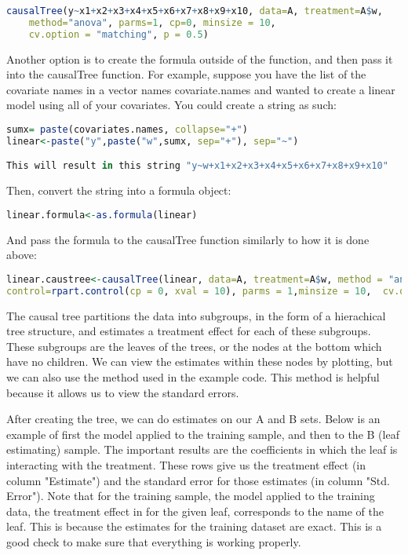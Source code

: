 \documentclass{article}
\begin{document}
\begin{lstlisting}[language=R]
causalTree(y~x1+x2+x3+x4+x5+x6+x7+x8+x9+x10, data=A, treatment=A$w, 
	method="anova", parms=1, cp=0, minsize = 10, 
	cv.option = "matching", p = 0.5)
\end{lstlisting}

Another option is to create the formula outside of the function, and then pass it into the causalTree function. For example, suppose you have the list of the covariate names in a vector names covariate.names and wanted to create a linear model using all of your covariates. You could create a string as such: 
\begin{lstlisting}[language=R]
sumx= paste(covariates.names, collapse="+") 
linear<-paste("y",paste("w",sumx, sep="+"), sep="~") 

This will result in this string "y~w+x1+x2+x3+x4+x5+x6+x7+x8+x9+x10" 
\end{lstlisting}

Then, convert the string into a formula object:
\begin{lstlisting}[language=R]
linear.formula<-as.formula(linear) 
\end{lstlisting}


And pass the formula to the causalTree function similarly to how it is done above: \\
\begin{lstlisting}[language=R]
linear.caustree<-causalTree(linear, data=A, treatment=A$w, method = "anova", 
control=rpart.control(cp = 0, xval = 10), parms = 1,minsize = 10,  cv.option = "matching", p = 0.5)
\end{lstlisting}


The causal tree partitions the data into subgroups, in the form of a hierachical tree structure, and estimates a treatment effect for each of these subgroups. 
These subgroups are the leaves of the trees, or the nodes at the bottom which have no children. We can view the estimates within these nodes by plotting, but we can also use the method used in the example code. This method is helpful because it allows us to view the standard errors. 

After creating the tree, we can do estimates on our A and B sets. Below is an example of first the model applied to the training sample, and then to the B (leaf estimating) sample. The important results are the coefficients in which  the leaf is interacting with the treatment. These rows give us the treatment effect (in column "Estimate") and the standard error for those estimates (in column "Std. Error"). Note that for the training sample, the model applied to the training data, the treatment effect in for the given leaf, corresponds to the name of the leaf. This is because the estimates for the training dataset are exact. This is a good check to make sure that everything is working properly. 
\end{document}

